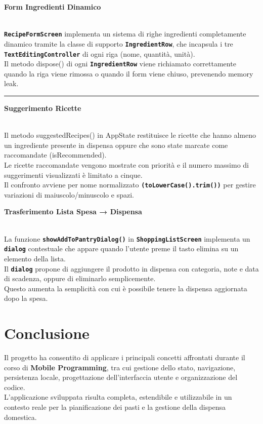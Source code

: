 \documentclass[a4paper, 12pt]{article}
\begin{document}
{\color{ForestGreen}\raggedright{\textbf{Form Ingredienti Dinamico}}}\\
\textbf{\texttt{RecipeFormScreen}} implementa un sistema di righe ingredienti completamente dinamico tramite la classe di supporto \textbf{\texttt{IngredientRow}}, che incapsula i tre \textbf{\texttt{TextEditingController}} di ogni riga (nome, quantità, unità). \\
Il metodo dispose() di ogni \textbf{\texttt{IngredientRow}} viene richiamato correttamente quando la riga viene rimossa o quando il form viene chiuso, prevenendo memory leak.
\newline

\vspace{0.5 cm}
\hrule
\vspace{0.5 cm}

{\color{ForestGreen}\raggedright{\textbf{Suggerimento Ricette}}}\\
Il metodo suggestedRecipes() in AppState restituisce le ricette che hanno almeno un ingrediente presente in dispensa oppure che sono state marcate come raccomandate (isRecommended). \\
Le ricette raccomandate vengono mostrate con priorità e il numero massimo di suggerimenti visualizzati è limitato a cinque. \\
Il confronto avviene per nome normalizzato \textbf{\texttt{(toLowerCase().trim())}} per gestire variazioni di maiuscolo/minuscolo e spazi.
\newline

\newpage

{\color{ForestGreen}\raggedright{\textbf{Trasferimento Lista Spesa → Dispensa}}}\\
La funzione \textbf{\texttt{showAddToPantryDialog()}} in \textbf{\texttt{ShoppingListScreen}} implementa un \textbf{\texttt{dialog}} contestuale che appare quando l’utente preme il tasto elimina su un elemento della lista. \\
Il \textbf{\texttt{dialog}} propone di aggiungere il prodotto in dispensa con categoria, note e data di scadenza, oppure di eliminarlo semplicemente. \\
Questo aumenta la semplicità con cui è possibile tenere la dispensa aggiornata dopo la spesa.





\section{Conclusione}
Il progetto ha consentito di applicare i principali concetti affrontati durante il corso di \textbf{Mobile Programming}, tra cui gestione dello stato, navigazione, persistenza locale, progettazione dell'interfaccia utente e organizzazione del codice.\\
L'applicazione sviluppata risulta completa, estendibile e utilizzabile in un contesto reale per la pianificazione dei pasti e la gestione della dispensa domestica. 
\end{document}
